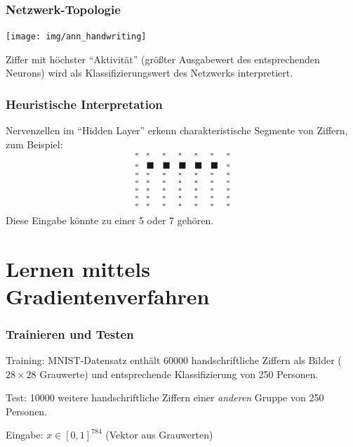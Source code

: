 \documentclass[
 a4paper,
 12pt,
 parskip=half
 ]{scrreprt}
\theoremstyle{plain}
\theoremstyle{definition}
\begin{document}
\subsubsection*{Netzwerk-Topologie}
\begin{center}
  \texttt{[image: img/ann\_handwriting]}
\end{center}
Ziffer mit höchster ``Aktivität'' (größter Ausgabewert des entsprechenden
Neurons) wird als Klassifizierungswert des Netzwerks interpretiert.

\subsubsection*{Heuristische Interpretation}
Nervenzellen im ``Hidden Layer'' erkenn charakteristische Segmente von Ziffern,
zum Beispiel:
\[ \begin{matrix}
    \square & \square & \square & \square & \square & \square & \square \\
    \square & \blacksquare & \blacksquare & \blacksquare &
    \blacksquare & \blacksquare & \square \\
    \square & \square & \square & \square & \square & \square & \square \\
    \square & \square & \square & \square & \square & \square & \square \\
    \square & \square & \square & \square & \square & \square & \square \\
    \square & \square & \square & \square & \square & \square & \square \\
    \square & \square & \square & \square & \square & \square & \square \\
  \end{matrix}
\]
Diese Eingabe könnte zu einer 5 oder 7 gehören.

\section{Lernen mittels Gradientenverfahren}
\subsubsection*{Trainieren und Testen}
Training: MNIST-Datensatz enthält 60000 handschriftliche
Ziffern als Bilder ($28 \times 28$ Grauwerte) und entsprechende Klassifizierung
von 250 Personen.

Test: 10000 weitere handschriftliche Ziffern einer \emph{anderen} Gruppe von
250 Personen.

Eingabe: $x \in [0,1]^{784}$ (Vektor aus Grauwerten)
\end{document}
